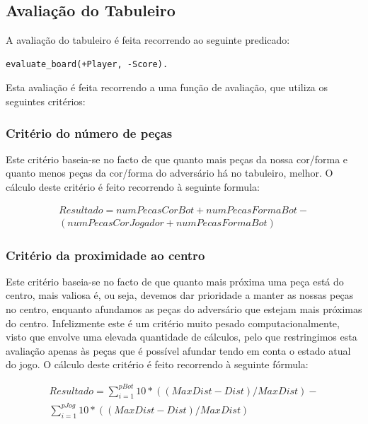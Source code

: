 \documentclass[a4paper]{article}
\begin{document}
\subsection{Avaliação do Tabuleiro}
\label{boardeval}

A avaliação do tabuleiro é feita recorrendo ao seguinte predicado:

\begin{lstlisting}
evaluate_board(+Player, -Score).
\end{lstlisting}

Esta avaliação é feita recorrendo a uma função de avaliação, que utiliza os seguintes critérios:

\subsubsection{Critério do número de peças}

Este critério baseia-se no facto de que quanto mais peças da nossa cor/forma e quanto menos peças da cor/forma do adversário há no tabuleiro, melhor. O cálculo deste critério é feito recorrendo à seguinte formula:

\begin{equation*}
\begin{multlined}
Resultado = numPecasCorBot + numPecasFormaBot - \\
(numPecasCorJogador + numPecasFormaBot)
\end{multlined}
\end{equation*}

\subsubsection{Critério da proximidade ao centro}

Este critério baseia-se no facto de que quanto mais próxima uma peça está do centro, mais valiosa é, ou seja, devemos dar prioridade a manter as nossas peças no centro, enquanto afundamos as peças do adversário que estejam mais próximas do centro. Infelizmente este é um critério muito pesado computacionalmente, visto que envolve uma elevada quantidade de cálculos, pelo que restringimos esta avaliação apenas às peças que é possível afundar tendo em conta o estado atual do jogo. O cálculo deste critério é feito recorrendo à seguinte fórmula:

\begin{equation*}
\begin{multlined}
Resultado = \sum\limits_{i=1}^{pBot} 10 * ((MaxDist - Dist) / MaxDist) - \\\sum\limits_{i=1}^{pJog} 10 * ((MaxDist - Dist) / MaxDist)
\end{multlined}
\end{equation*}
\end{document}
